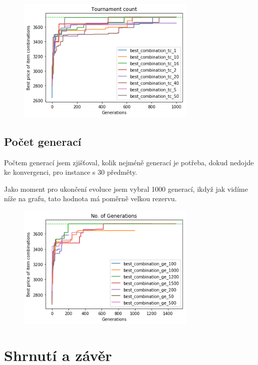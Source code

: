 \documentclass[a4paper,10pt,twocolumn]{article}
\begin{document}
\begin{itemize}
\begin{itemize}
\begin{figure}[H]
  \begin{center}
    \includegraphics[height=6cm]{graphs/tournament_count.png}
  \end{center}
\end{figure}


\subsection{Počet generací}

Počtem generací jsem zjišťoval, kolik nejméně generací je potřeba, dokud nedojde ke konvergenci, pro instance s 30 předměty.

Jako moment pro ukončení evoluce jsem vybral 1000 generací, ikdyž jak vidíme níže na grafu, tato hodnota má poměrně velkou rezervu.


\begin{figure}[H]
  \begin{center}
    \includegraphics[height=6cm]{graphs/generations.png}
  \end{center}
\end{figure}


\section{Shrnutí a závěr}


\end{itemize}
\end{itemize}
\end{document}
